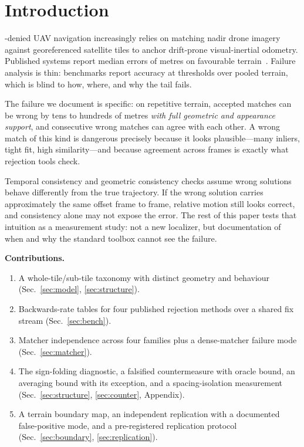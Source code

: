 \documentclass[journal]{IEEEtran}
\begin{document}
\IEEEpeerreviewmaketitle

\section{Introduction}
-denied UAV navigation increasingly relies on matching nadir drone imagery against georeferenced satellite tiles to anchor drift-prone visual-inertial odometry. Published systems report median errors of metres on favourable terrain~\cite{anyvisloc,orthotrack,ortholoc}. Failure analysis is thin: benchmarks report accuracy at thresholds over pooled terrain, which is blind to how, where, and why the tail fails.

The failure we document is specific: on repetitive terrain, accepted matches can be wrong by tens to hundreds of metres \emph{with full geometric and appearance support}, and consecutive wrong matches can agree with each other. A wrong match of this kind is dangerous precisely because it looks plausible---many inliers, tight fit, high similarity---and because agreement across frames is exactly what rejection tools check.

Temporal consistency and geometric consistency checks assume wrong solutions behave differently from the true trajectory. If the wrong solution carries approximately the same offset frame to frame, relative motion still looks correct, and consistency alone may not expose the error. The rest of this paper tests that intuition as a measurement study: not a new localizer, but documentation of when and why the standard toolbox cannot see the failure.


\noindent\textbf{Contributions.}
\begin{enumerate}
\item A whole-tile/sub-tile taxonomy with distinct geometry and behaviour (Sec.~\ref{sec:model}, \ref{sec:structure}).
\item Backwards-rate tables for four published rejection methods over a shared fix stream (Sec.~\ref{sec:bench}).
\item Matcher independence across four families plus a dense-matcher failure mode (Sec.~\ref{sec:matcher}).
\item The sign-folding diagnostic, a falsified countermeasure with oracle bound, an averaging bound with its exception, and a spacing-isolation measurement (Sec.~\ref{sec:structure}, \ref{sec:counter}, Appendix).
\item A terrain boundary map, an independent replication with a documented false-positive mode, and a pre-registered replication protocol (Sec.~\ref{sec:boundary}, \ref{sec:replication}).
\end{enumerate}
\end{document}
